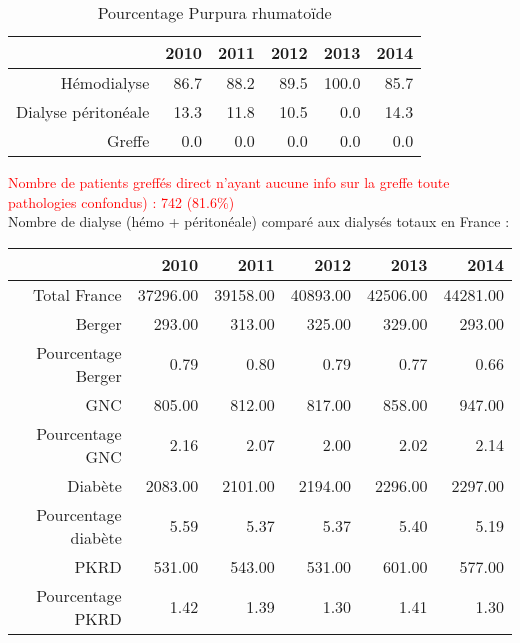 \documentclass[11pt,a4paper]{article}\usepackage[]{graphicx}\usepackage[]{color}
\begin{document}
\begin{table}[H]
\centering
\begin{tabular}{rrrrrr}
  \hline
 & 2010 & 2011 & 2012 & 2013 & 2014 \\ 
  \hline
Hémodialyse & 86.7 & 88.2 & 89.5 & 100.0 & 85.7 \\ 
  Dialyse péritonéale & 13.3 & 11.8 & 10.5 & 0.0 & 14.3 \\ 
  Greffe & 0.0 & 0.0 & 0.0 & 0.0 & 0.0 \\ 
   \hline
\end{tabular}
\caption{Pourcentage Purpura rhumatoïde} 
\end{table}



\textcolor{red}{Nombre de patients greffés direct n'ayant aucune info sur la greffe toute pathologies confondus) : 742 (81.6\%)}
~\\




Nombre de dialyse (hémo + péritonéale) comparé aux dialysés totaux en France :

\begin{table}[H]
\centering
\begin{tabular}{rrrrrr}
  \hline
 & 2010 & 2011 & 2012 & 2013 & 2014 \\ 
  \hline
Total France & 37296.00 & 39158.00 & 40893.00 & 42506.00 & 44281.00 \\ 
  Berger & 293.00 & 313.00 & 325.00 & 329.00 & 293.00 \\ 
  Pourcentage Berger & 0.79 & 0.80 & 0.79 & 0.77 & 0.66 \\ 
  GNC & 805.00 & 812.00 & 817.00 & 858.00 & 947.00 \\ 
  Pourcentage GNC & 2.16 & 2.07 & 2.00 & 2.02 & 2.14 \\ 
  Diabète & 2083.00 & 2101.00 & 2194.00 & 2296.00 & 2297.00 \\ 
  Pourcentage diabète & 5.59 & 5.37 & 5.37 & 5.40 & 5.19 \\ 
  PKRD & 531.00 & 543.00 & 531.00 & 601.00 & 577.00 \\ 
  Pourcentage PKRD & 1.42 & 1.39 & 1.30 & 1.41 & 1.30 \\ 
   \hline
\end{tabular}
\end{table}
\end{document}
